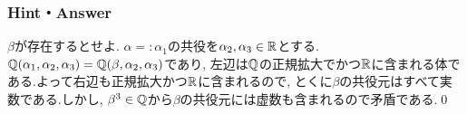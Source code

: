 \subsubsection{Hint・Answer}
{\small
\begin{probans}
$\beta$が存在するとせよ. $\alpha=:\alpha_1$の共役を$\alpha_2,\alpha_3\in \mathbb{R}$とする.$\mathbb{Q}(\alpha_1,\alpha_2,\alpha_3) = \mathbb{Q}(\beta,\alpha_2,\alpha_3)$であり, 左辺は$\mathbb{Q}$の正規拡大でかつ$\mathbb{R}$に含まれる体である.よって右辺も正規拡大かつ$\mathbb{R}$に含まれるので, とくに$\beta$の共役元はすべて実数である.しかし, $\beta^{3}\in \mathbb{Q}$から$\beta$の共役元には虚数も含まれるので矛盾である.\qed
\end{probans}


}



\clearpage

